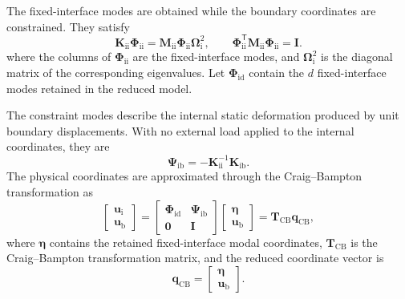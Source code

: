 \documentclass[11pt,a4paper]{article}
\numberwithin{equation}{section}
\begin{document}
The fixed-interface modes are obtained while the boundary coordinates are constrained. They satisfy
\begin{equation}
	\mathbf{K}_{\mathrm{ii}}\bm{\Phi}_{\mathrm{ii}}
	=\mathbf{M}_{\mathrm{ii}}\bm{\Phi}_{\mathrm{ii}}\bm{\Omega}_{\mathrm{i}}^{2},
	\qquad
	\bm{\Phi}_{\mathrm{ii}}^{\mathsf{T}}\mathbf{M}_{\mathrm{ii}}\bm{\Phi}_{\mathrm{ii}}=\mathbf{I}.
	\label{eq:fixed-interface-modes}
\end{equation}
where the columns of \(\bm{\Phi}_{\mathrm{ii}}\) are the fixed-interface modes, and \(\bm{\Omega}_{\mathrm{i}}^{2}\) is the diagonal matrix of the corresponding eigenvalues. Let \(\bm{\Phi}_{\mathrm{id}}\) contain the \(d\) fixed-interface modes retained in the reduced model.

The constraint modes describe the internal static deformation produced by unit boundary displacements. With no external load applied to the internal coordinates, they are
\begin{equation}
	\bm{\Psi}_{\mathrm{ib}}=-\mathbf{K}_{\mathrm{ii}}^{-1}\mathbf{K}_{\mathrm{ib}}.
	\label{eq:constraint-modes}
\end{equation}
The physical coordinates are approximated through the Craig--Bampton transformation as
\begin{equation}
	\begin{bmatrix}
		\bm{u}_{\mathrm{i}}\\
		\bm{u}_{\mathrm{b}}
	\end{bmatrix}
	=
	\begin{bmatrix}
		\bm{\Phi}_{\mathrm{id}} & \bm{\Psi}_{\mathrm{ib}}\\
		\mathbf{0} & \mathbf{I}
	\end{bmatrix}
	\begin{bmatrix}
		\bm{\eta}\\
		\bm{u}_{\mathrm{b}}
	\end{bmatrix}
	=
	\mathbf{T}_{\mathrm{CB}}\bm{q}_{\mathrm{CB}},
	\label{eq:cb-transformation}
\end{equation}
where \(\bm{\eta}\) contains the retained fixed-interface modal coordinates, \(\mathbf{T}_{\mathrm{CB}}\) is the Craig--Bampton transformation matrix, and the reduced coordinate vector is
\begin{equation}
	\bm{q}_{\mathrm{CB}}=
	\begin{bmatrix}
		\bm{\eta}\\
		\bm{u}_{\mathrm{b}}
	\end{bmatrix}.
	\label{eq:cb-reduced-coordinate}
\end{equation}
\end{document}
